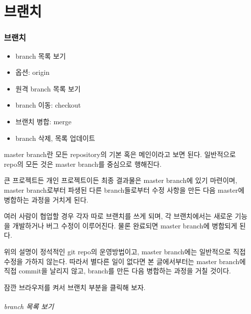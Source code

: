 \documentclass[12pt, a4paper, oneside]{book}
\let\stdsection\section
\renewcommand\section{\newpage\stdsection}
\begin{document}
	\part 	{브랜치}

	\noptcrule
	\parttoc	
	\minitoc
				


%										
	\section{브랜치}

			\begin{itemize}	[	
							topsep=0.0em,
							itemsep=0.0em,
							leftmargin=6em, 
							labelsep=3em 
							]
				\item 	branch 목록 보기
				\item 	옵션: origin
				\item	원격 branch 목록 보기
				\item	branch 이동: checkout
				\item	브랜치 병합: merge
				\item	branch 삭제, 목록 업데이트
			\end{itemize}


master branch란 모든 repository의 기본 혹은 메인이라고 보면 된다. 
일반적으로 repo의 모든 것은 master branch를 중심으로 행해진다.

큰 프로젝트든 개인 프로젝트이든 최종 결과물은 master branch에 있기 마련이며, 
master branch로부터 파생된 다른 branch들로부터 수정 사항을 만든 다음 
master에 병합하는 과정을 거치게 된다.

여러 사람이 협업할 경우 각자 따로 브랜치를 쓰게 되며, 
각 브랜치에서는 새로운 기능을 개발하거나 버그 수정이 이루어진다. 
물론 완료되면 master branch에 병합되게 된다.

위의 설명이 정석적인 git repo의 운영방법이고, 
master branch에는 일반적으로 직접 수정을 가하지 않는다. 
따라서 별다른 일이 없다면 본 글에서부터는 master branch에 직접 commit을 날리지 않고, 
branch를 만든 다음 병합하는 과정을 거칠 것이다.

잠깐 브라우저를 켜서 브랜치 부분을 클릭해 보자.

\paragraph{branch 목록 보기}
\end{document}
